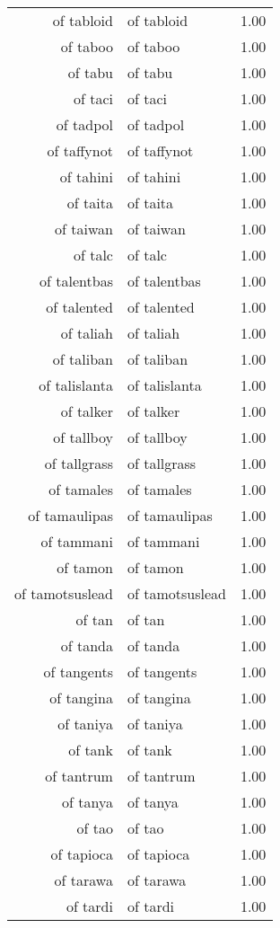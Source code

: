 \begin{table}[ht]
\begin{tabular}{rlr}
  of tabloid & of tabloid & 1.00 \\ 
  of taboo & of taboo & 1.00 \\ 
  of tabu & of tabu & 1.00 \\ 
  of taci & of taci & 1.00 \\ 
  of tadpol & of tadpol & 1.00 \\ 
  of taffynot & of taffynot & 1.00 \\ 
  of tahini & of tahini & 1.00 \\ 
  of taita & of taita & 1.00 \\ 
  of taiwan & of taiwan & 1.00 \\ 
  of talc & of talc & 1.00 \\ 
  of talentbas & of talentbas & 1.00 \\ 
  of talented & of talented & 1.00 \\ 
  of taliah & of taliah & 1.00 \\ 
  of taliban & of taliban & 1.00 \\ 
  of talislanta & of talislanta & 1.00 \\ 
  of talker & of talker & 1.00 \\ 
  of tallboy & of tallboy & 1.00 \\ 
  of tallgrass & of tallgrass & 1.00 \\ 
  of tamales & of tamales & 1.00 \\ 
  of tamaulipas & of tamaulipas & 1.00 \\ 
  of tammani & of tammani & 1.00 \\ 
  of tamon & of tamon & 1.00 \\ 
  of tamotsuslead & of tamotsuslead & 1.00 \\ 
  of tan & of tan & 1.00 \\ 
  of tanda & of tanda & 1.00 \\ 
  of tangents & of tangents & 1.00 \\ 
  of tangina & of tangina & 1.00 \\ 
  of taniya & of taniya & 1.00 \\ 
  of tank & of tank & 1.00 \\ 
  of tantrum & of tantrum & 1.00 \\ 
  of tanya & of tanya & 1.00 \\ 
  of tao & of tao & 1.00 \\ 
  of tapioca & of tapioca & 1.00 \\ 
  of tarawa & of tarawa & 1.00 \\ 
  of tardi & of tardi & 1.00 \\ 

\end{tabular}
\end{table}
